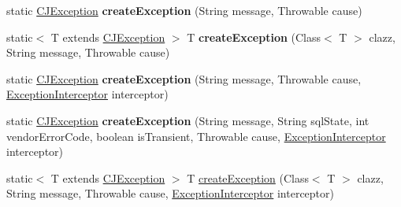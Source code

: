 \begin{DoxyCompactItemize}
\item 
\mbox{\label{classcom_1_1mysql_1_1cj_1_1exceptions_1_1_exception_factory_a78018cc953e683b33315d1c8754440bc}} 
static \mbox{\hyperlink{classcom_1_1mysql_1_1cj_1_1exceptions_1_1_c_j_exception}{C\+J\+Exception}} {\bfseries create\+Exception} (String message, Throwable cause)
\item 
\mbox{\label{classcom_1_1mysql_1_1cj_1_1exceptions_1_1_exception_factory_abdd488af1199e60637c17ee9bbb5d6cd}} 
static$<$ T extends \mbox{\hyperlink{classcom_1_1mysql_1_1cj_1_1exceptions_1_1_c_j_exception}{C\+J\+Exception}} $>$ T {\bfseries create\+Exception} (Class$<$ T $>$ clazz, String message, Throwable cause)
\item 
\mbox{\label{classcom_1_1mysql_1_1cj_1_1exceptions_1_1_exception_factory_a34c3a1eeedc214e84877e21b46ecb987}} 
static \mbox{\hyperlink{classcom_1_1mysql_1_1cj_1_1exceptions_1_1_c_j_exception}{C\+J\+Exception}} {\bfseries create\+Exception} (String message, Throwable cause, \mbox{\hyperlink{interfacecom_1_1mysql_1_1cj_1_1exceptions_1_1_exception_interceptor}{Exception\+Interceptor}} interceptor)
\item 
\mbox{\label{classcom_1_1mysql_1_1cj_1_1exceptions_1_1_exception_factory_aef1a90d20ca0bc44c8f13775f9a6a9ac}} 
static \mbox{\hyperlink{classcom_1_1mysql_1_1cj_1_1exceptions_1_1_c_j_exception}{C\+J\+Exception}} {\bfseries create\+Exception} (String message, String sql\+State, int vendor\+Error\+Code, boolean is\+Transient, Throwable cause, \mbox{\hyperlink{interfacecom_1_1mysql_1_1cj_1_1exceptions_1_1_exception_interceptor}{Exception\+Interceptor}} interceptor)
\item 
static$<$ T extends \mbox{\hyperlink{classcom_1_1mysql_1_1cj_1_1exceptions_1_1_c_j_exception}{C\+J\+Exception}} $>$ T \mbox{\hyperlink{classcom_1_1mysql_1_1cj_1_1exceptions_1_1_exception_factory_a3f60b3a0bdec23f573ae589ada6c5c1e}{create\+Exception}} (Class$<$ T $>$ clazz, String message, Throwable cause, \mbox{\hyperlink{interfacecom_1_1mysql_1_1cj_1_1exceptions_1_1_exception_interceptor}{Exception\+Interceptor}} interceptor)
\item 
\mbox{\label{classcom_1_1mysql_1_1cj_1_1exceptions_1_1_exception_factory_a227f3097e48f66392c93399bae8fa2ce}} 

\end{DoxyCompactItemize}
